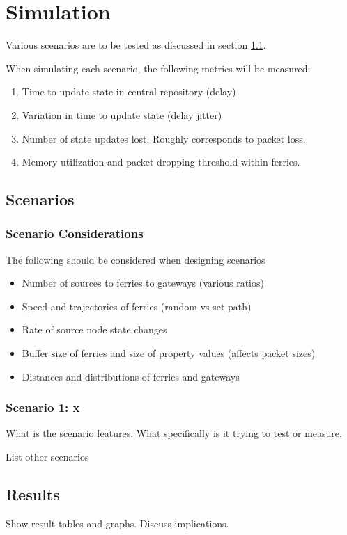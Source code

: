 \chapter{Simulation} 

Various scenarios are to be tested as discussed in section \ref{sec:scenarios}.

When simulating each scenario, the following metrics will be measured:
\begin{enumerate}
\item Time to update state in central repository (delay)
\item Variation in time to update state (delay jitter)
\item Number of state updates lost. Roughly corresponds to packet loss.
\item Memory utilization and packet dropping threshold within ferries.
\end{enumerate}

\section{Scenarios}
\label{sec:scenarios}

\subsection{Scenario Considerations}

The following should be considered when designing scenarios
\begin{itemize}
\item Number of sources to ferries to gateways (various ratios)
\item Speed and trajectories of ferries (random vs set path)
\item Rate of source node state changes
\item Buffer size of ferries and size of property values (affects packet sizes)
\item Distances and distributions of ferries and gateways
\end{itemize}

\subsection{Scenario 1: x}

What is the scenario features. 
What specifically is it trying to test or measure.

List other scenarios

\section{Results}

Show result tables and graphs.
Discuss implications.

